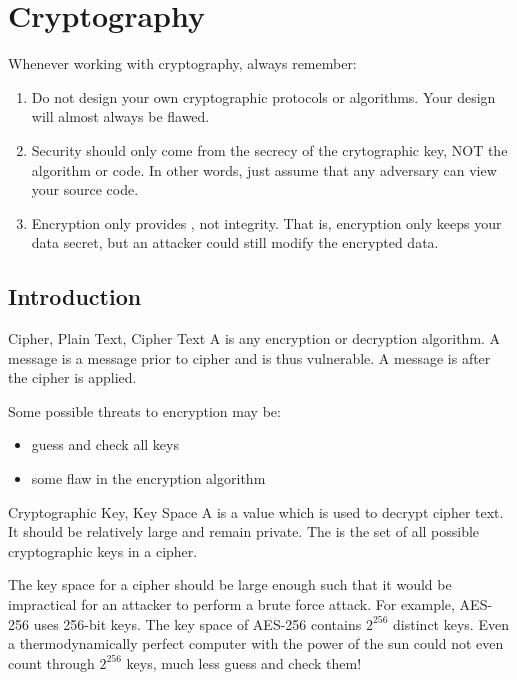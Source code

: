 \chapter{Cryptography}
Whenever working with cryptography, always remember:
\begin{enumerate}[noitemsep]
    \item Do not design your own cryptographic protocols or algorithms. Your design will almost always be flawed.
    \item {} Security should only come from the secrecy of the crytographic key, NOT the algorithm or code. In other words, just assume that any adversary can view your source code.
    \item Encryption only provides , not integrity. That is, encryption only keeps your data secret, but an attacker could still modify the encrypted data.
\end{enumerate}

\section{Introduction}

\begin{dfnbox}{Cipher, Plain Text, Cipher Text}{}
    A  is any encryption or decryption algorithm. A  message is a message prior to cipher and is thus vulnerable. A  message is after the cipher is applied.
\end{dfnbox}

Some possible threats to encryption may be:
\begin{itemize}[noitemsep]
    \item {} guess and check all keys
    \item {} some flaw in the encryption algorithm
\end{itemize}

\begin{dfnbox}{Cryptographic Key, Key Space}{}
    A  is a value which is used to decrypt cipher text. It should be relatively large and remain private. The  is the set of all possible cryptographic keys in a cipher.
\end{dfnbox}

The key space for a cipher should be large enough such that it would be impractical for an attacker to perform a brute force attack. For example, AES-256 uses 256-bit keys. The key space of AES-256 contains $2^{256}$ distinct keys. Even a thermodynamically perfect computer with the power of the sun could not even count through $2^{256}$ keys, much less guess and check them!

